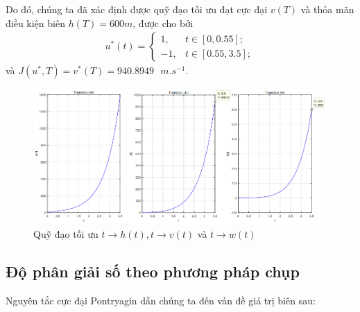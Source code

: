 \documentclass[12pt,a4paper]{report}
\begin{document}
Do đó, chúng ta đã xác định được quỹ đạo tối ưu đạt cực đại $v(T)$ và thỏa mãn điều kiện biên $h(T) = 600m$, được cho bởi
\begin{eqnarray}
u^*(t) =	\begin{cases}
		1, & t \in [0, 0.55];\\ -1, & t\in[0.55, 3.5];
	\end{cases}
\end{eqnarray} và $J(u^*, T) = v^*(T) = 940.8949 \text{ } m.s^{-1}.$

\begin{figure}[h]
	\centering
	\includegraphics[scale=.6]{./image/hinh3.png}
	\caption{Quỹ đạo tối ưu $t \to h(t), t\to v(t)$ và $t\to w(t)$}
\end{figure}
	\subsection{Độ phân giải số theo phương pháp chụp}
	
	Nguyên tắc cực đại Pontryagin dẫn chúng ta đến vấn đề giá trị biên sau:
	
\end{document}
